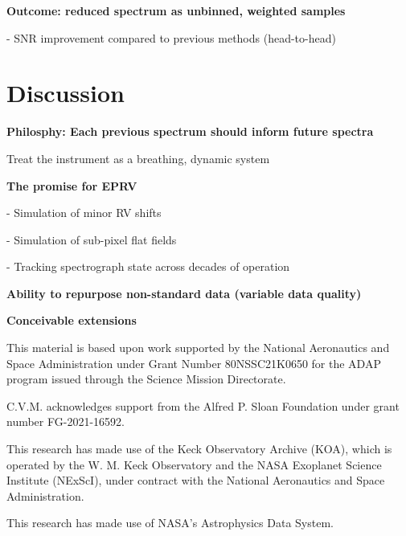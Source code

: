 \documentclass[twocolumn]{aastex631}
\begin{document}
\begin{mdframed}
  \textbf{Outcome: reduced spectrum as unbinned, weighted samples} \par
  - SNR improvement compared to previous methods (head-to-head)\par
  \textcolor{lightgray}{\lipsum[13]}
\end{mdframed}

\pagebreak
\clearpage

\section{Discussion}\label{secDiscuss}

\begin{mdframed}
  \textbf{Philosphy: Each previous spectrum should inform future spectra} \par
  Treat the instrument as a breathing, dynamic system\par
  \textcolor{lightgray}{\lipsum[5]}
\end{mdframed}

\begin{mdframed}
  \textbf{The promise for EPRV} \par
  - Simulation of minor RV shifts\par
  - Simulation of sub-pixel flat fields \par
  - Tracking spectrograph state across decades of operation\par
  \textcolor{lightgray}{\lipsum[14]}
\end{mdframed}


\begin{mdframed}
  \textbf{Ability to repurpose non-standard data (variable data quality)} \par
  \textcolor{lightgray}{\lipsum[15]}
\end{mdframed}


\begin{mdframed}
  \textbf{Conceivable extensions} \par
  \textcolor{lightgray}{\lipsum[16]}
\end{mdframed}



\begin{acknowledgements}
  This material is based upon work supported by the National Aeronautics and Space Administration under Grant Number 80NSSC21K0650 for the ADAP program issued through the Science Mission Directorate.

  C.V.M. acknowledges support from the Alfred P. Sloan Foundation under grant number FG-2021-16592.

  This research has made use of the Keck Observatory Archive (KOA), which is operated by the W. M. Keck Observatory and the NASA Exoplanet Science Institute (NExScI), under contract with the National Aeronautics and Space Administration.

  This research has made use of NASA's Astrophysics Data System.
\end{acknowledgements}
\end{document}
